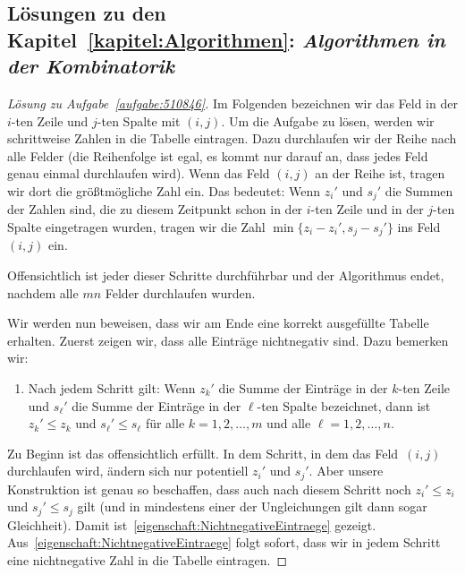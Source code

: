 \subsection*{Lösungen zu den Kapitel~\ref{kapitel:Algorithmen}: \emph{Algorithmen in der Kombinatorik}}

\begin{proof}[Lösung zu Aufgabe~\ref{aufgabe:510846}]
	Im Folgenden bezeichnen wir das Feld in der $i$-ten Zeile und $j$-ten Spalte mit $(i,j)$. Um die Aufgabe zu lösen, werden wir schrittweise Zahlen in die Tabelle eintragen. Dazu durchlaufen wir der Reihe nach alle Felder (die Reihenfolge ist egal, es kommt nur darauf an, dass jedes Feld genau einmal durchlaufen wird). Wenn das Feld $(i,j)$ an der Reihe ist, tragen wir dort die größtmögliche Zahl ein. Das bedeutet: Wenn $z_i'$ und $s_j'$ die Summen der Zahlen sind, die zu diesem Zeitpunkt schon in der $i$-ten Zeile und in der $j$-ten Spalte eingetragen wurden, tragen wir die Zahl $\min\{z_i-z_i',s_j-s_j'\}$ ins Feld $(i,j)$ ein.
	
	Offensichtlich ist jeder dieser Schritte durchführbar und der Algorithmus endet, nachdem alle $mn$ Felder durchlaufen wurden.
	
	Wir werden nun beweisen, dass wir am Ende eine korrekt ausgefüllte Tabelle erhalten. Zuerst zeigen wir, dass alle Einträge nichtnegativ sind. Dazu bemerken wir:
	\begin{enumerate}[label={$(\arabic*)$},ref={$(\arabic*)$}]\itshape
		\item Nach jedem Schritt gilt: Wenn $z_k'$ die Summe der Einträge in der $k$-ten Zeile und $s_\ell'$ die Summe der Einträge in der $\ell$-ten Spalte bezeichnet, dann ist $z_k'\leqslant z_k$ und $s_\ell'\leqslant s_\ell$ für alle  $k=1,2,\dotsc,m$ und alle $\ell=1,2,\dotsc,n$.\label{eigenschaft:NichtnegativeEintraege}
	\end{enumerate}
	Zu Beginn ist das offensichtlich erfüllt. In dem Schritt, in dem das Feld~$(i,j)$ durchlaufen wird, ändern sich nur potentiell $z_i'$ und $s_j'$. Aber unsere Konstruktion ist genau so beschaffen, dass auch nach diesem Schritt noch $z_i'\leqslant z_i$ und $s_j'\leqslant s_j$ gilt (und in mindestens einer der Ungleichungen gilt dann sogar Gleichheit). Damit ist~\ref{eigenschaft:NichtnegativeEintraege} gezeigt. Aus~\ref{eigenschaft:NichtnegativeEintraege} folgt sofort, dass wir in jedem Schritt eine nichtnegative Zahl in die Tabelle eintragen.
	

\end{proof}
